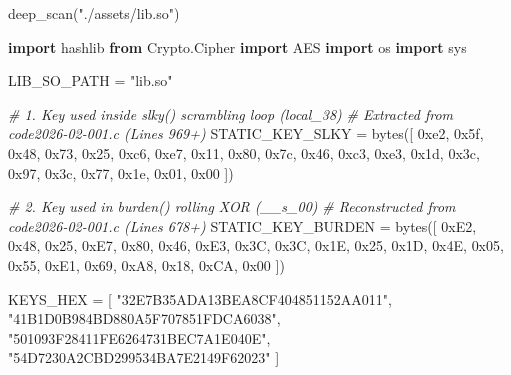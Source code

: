 \documentclass[
]{article}
\newenvironment{Shaded}{}{}
\newcommand{\BaseNTok}[1]{\textcolor[rgb]{0.25,0.63,0.44}{#1}}
\newcommand{\BuiltInTok}[1]{\textcolor[rgb]{0.00,0.50,0.00}{#1}}
\newcommand{\CommentTok}[1]{\textcolor[rgb]{0.38,0.63,0.69}{\textit{#1}}}
\newcommand{\ImportTok}[1]{\textcolor[rgb]{0.00,0.50,0.00}{\textbf{#1}}}
\newcommand{\NormalTok}[1]{#1}
\newcommand{\OperatorTok}[1]{\textcolor[rgb]{0.40,0.40,0.40}{#1}}
\newcommand{\StringTok}[1]{\textcolor[rgb]{0.25,0.44,0.63}{#1}}
\begin{document}
\begin{Shaded}
\begin{Highlighting}[]
\NormalTok{deep\_scan(}\StringTok{"./assets/lib.so"}\NormalTok{)}
\end{Highlighting}
\end{Shaded}

\begin{Shaded}
\begin{Highlighting}[]
\ImportTok{import}\NormalTok{ hashlib}
\ImportTok{from}\NormalTok{ Crypto.Cipher }\ImportTok{import}\NormalTok{ AES}
\ImportTok{import}\NormalTok{ os}
\ImportTok{import}\NormalTok{ sys}

\NormalTok{LIB\_SO\_PATH }\OperatorTok{=} \StringTok{"lib.so"}

\CommentTok{\# 1. Key used inside slky() scrambling loop (local\_38)}
\CommentTok{\# Extracted from code2026{-}02{-}001.c (Lines 969+)}
\NormalTok{STATIC\_KEY\_SLKY }\OperatorTok{=} \BuiltInTok{bytes}\NormalTok{([}
    \BaseNTok{0xe2}\NormalTok{, }\BaseNTok{0x5f}\NormalTok{, }\BaseNTok{0x48}\NormalTok{, }\BaseNTok{0x73}\NormalTok{, }\BaseNTok{0x25}\NormalTok{, }\BaseNTok{0xc6}\NormalTok{, }\BaseNTok{0xe7}\NormalTok{, }\BaseNTok{0x11}\NormalTok{, }
    \BaseNTok{0x80}\NormalTok{, }\BaseNTok{0x7c}\NormalTok{, }\BaseNTok{0x46}\NormalTok{, }\BaseNTok{0xc3}\NormalTok{, }\BaseNTok{0xe3}\NormalTok{, }\BaseNTok{0x1d}\NormalTok{, }\BaseNTok{0x3c}\NormalTok{, }\BaseNTok{0x97}\NormalTok{, }
    \BaseNTok{0x3c}\NormalTok{, }\BaseNTok{0x77}\NormalTok{, }\BaseNTok{0x1e}\NormalTok{, }\BaseNTok{0x01}\NormalTok{, }\BaseNTok{0x00}
\NormalTok{])}

\CommentTok{\# 2. Key used in burden() rolling XOR (\_\_s\_00)}
\CommentTok{\# Reconstructed from code2026{-}02{-}001.c (Lines 678+)}
\NormalTok{STATIC\_KEY\_BURDEN }\OperatorTok{=} \BuiltInTok{bytes}\NormalTok{([}
    \BaseNTok{0xE2}\NormalTok{, }\BaseNTok{0x48}\NormalTok{, }\BaseNTok{0x25}\NormalTok{, }\BaseNTok{0xE7}\NormalTok{, }\BaseNTok{0x80}\NormalTok{, }\BaseNTok{0x46}\NormalTok{, }\BaseNTok{0xE3}\NormalTok{, }\BaseNTok{0x3C}\NormalTok{,}
    \BaseNTok{0x3C}\NormalTok{, }\BaseNTok{0x1E}\NormalTok{, }\BaseNTok{0x25}\NormalTok{, }\BaseNTok{0x1D}\NormalTok{, }\BaseNTok{0x4E}\NormalTok{, }\BaseNTok{0x05}\NormalTok{, }\BaseNTok{0x55}\NormalTok{, }\BaseNTok{0xE1}\NormalTok{,}
    \BaseNTok{0x69}\NormalTok{, }\BaseNTok{0xA8}\NormalTok{, }\BaseNTok{0x18}\NormalTok{, }\BaseNTok{0xCA}\NormalTok{, }\BaseNTok{0x00}
\NormalTok{])}

\NormalTok{KEYS\_HEX }\OperatorTok{=}\NormalTok{ [}
    \StringTok{"32E7B35ADA13BEA8CF404851152AA011"}\NormalTok{,}
    \StringTok{"41B1D0B984BD880A5F707851FDCA6038"}\NormalTok{,}
    \StringTok{"501093F28411FE6264731BEC7A1E040E"}\NormalTok{,}
    \StringTok{"54D7230A2CBD299534BA7E2149F62023"}
\NormalTok{]}


\end{Highlighting}
\end{Shaded}
\end{document}
